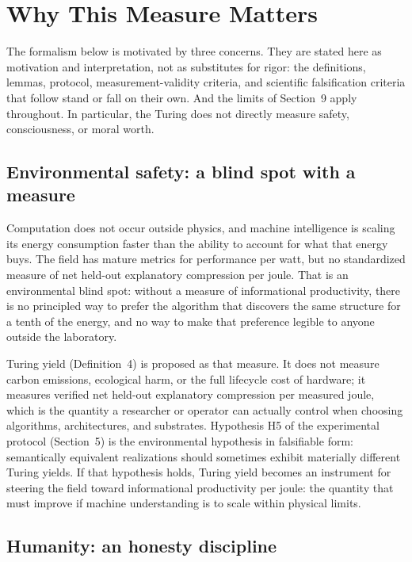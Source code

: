 \documentclass[11pt]{article}
\begin{document}
\section{Why This Measure Matters}

The formalism below is motivated by three concerns. They are stated here as motivation and interpretation, not as substitutes for rigor: the definitions, lemmas, protocol, measurement-validity criteria, and scientific falsification criteria that follow stand or fall on their own. And the limits of Section~9 apply throughout. In particular, the Turing does not directly measure safety, consciousness, or moral worth.

\subsection{Environmental safety: a blind spot with a measure}

Computation does not occur outside physics, and machine intelligence is scaling its energy consumption faster than the ability to account for what that energy buys. The field has mature metrics for performance per watt, but no standardized measure of net held-out explanatory compression per joule. That is an environmental blind spot: without a measure of informational productivity, there is no principled way to prefer the algorithm that discovers the same structure for a tenth of the energy, and no way to make that preference legible to anyone outside the laboratory.

Turing yield (Definition~4) is proposed as that measure. It does not measure carbon emissions, ecological harm, or the full lifecycle cost of hardware; it measures verified net held-out explanatory compression per measured joule, which is the quantity a researcher or operator can actually control when choosing algorithms, architectures, and substrates. Hypothesis H5 of the experimental protocol (Section~5) is the environmental hypothesis in falsifiable form: semantically equivalent realizations should sometimes exhibit materially different Turing yields. If that hypothesis holds, Turing yield becomes an instrument for steering the field toward informational productivity per joule: the quantity that must improve if machine understanding is to scale within physical limits.

\subsection{Humanity: an honesty discipline}
\end{document}
